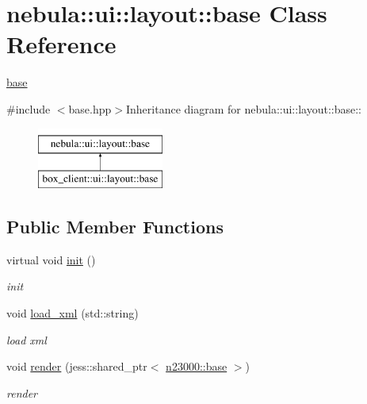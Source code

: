 \hypertarget{classnebula_1_1ui_1_1layout_1_1base}{
\section{nebula::ui::layout::base Class Reference}
\label{classnebula_1_1ui_1_1layout_1_1base}
}


\hyperlink{classnebula_1_1ui_1_1layout_1_1base}{base}  


{\ttfamily \#include $<$base.hpp$>$}Inheritance diagram for nebula::ui::layout::base::\begin{figure}[H]
\begin{center}
\leavevmode
\includegraphics[height=2cm]{classnebula_1_1ui_1_1layout_1_1base}
\end{center}
\end{figure}
\subsection*{Public Member Functions}
\begin{DoxyCompactItemize}
\item 
virtual void \hyperlink{classnebula_1_1ui_1_1layout_1_1base_adfe11cc1bd625192a5bede3a51765280}{init} ()
\begin{DoxyCompactList}\small\item\em init \item\end{DoxyCompactList}\item 
void \hyperlink{classnebula_1_1ui_1_1layout_1_1base_a89450b82c4ad64508bc0254b0fc2e8fc}{load\_\-xml} (std::string)
\begin{DoxyCompactList}\small\item\em load xml \item\end{DoxyCompactList}\item 
void \hyperlink{classnebula_1_1ui_1_1layout_1_1base_a43e2a38dd439038673ae39e31efca533}{render} (jess::shared\_\-ptr$<$ \hyperlink{classnebula_1_1platform_1_1renderer_1_1base}{n23000::base} $>$)
\begin{DoxyCompactList}\small\item\em render \item\end{DoxyCompactList}\end{DoxyCompactItemize}
